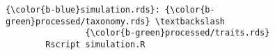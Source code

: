 \documentclass[class=minimal,border=0]{standalone}
\begin{document}
%
\begin{BVerbatim}[bgcolor=b-darkgrey]
{\color{b-blue}simulation.rds}: {\color{b-green}processed/taxonomy.rds} \textbackslash
                {\color{b-green}processed/traits.rds}
        Rscript simulation.R
\end{BVerbatim}
\end{document}
